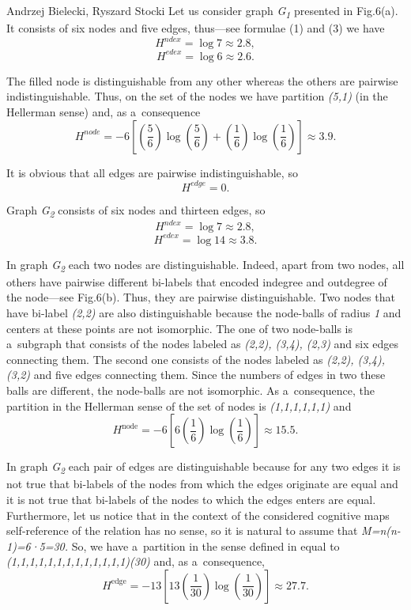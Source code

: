 \begin{artengenv2auth}{Andrzej Bielecki, Ryszard Stocki}
Let us consider graph \textit{G}\textit{\textsubscript{1}} presented in Fig.6(a). It consists of six nodes and five edges, thus---see formulae (1) and (3) we have
\[
H^{\textit{ndex}} = \log 7 \approx 2.8,
\]
\[
H^{\textit{edex}} = \log 6 \approx 2.6.
\]

The filled node is distinguishable from any other whereas the others are pairwise indistinguishable. Thus, on the set of the nodes we have partition \textit{(5,1)} (in the Hellerman sense) and, as a~consequence
\[
H^{\textit{node}} = -6 \left[ \left(\frac{5}{6}\right) \log\left(\frac{5}{6}\right) + \left(\frac{1}{6}\right) \log\left(\frac{1}{6}\right) \right] \approx 3.9.
\]

It is obvious that all edges are pairwise indistinguishable, so
\[
H^{\textit{edge}} = 0.
\]

Graph \textit{G}\textit{\textsubscript{2}} consists of six nodes and thirteen edges, so
\[
H^{\textit{ndex}} = \log 7 \approx 2.8,
\]
\[
H^{\textit{edex}} = \log 14 \approx 3.8.
\]

In graph \textit{G}\textit{\textsubscript{2}} each two nodes are distinguishable. Indeed, apart from two nodes, all others have pairwise different bi-labels that encoded indegree and outdegree of the node---see Fig.6(b). Thus, they are pairwise distinguishable. Two nodes that have bi-label \textit{(2,2)} are also distinguishable because the node-balls of radius \textit{1} and centers at these points are not isomorphic. The one of two node-balls is a~subgraph that consists of the nodes labeled as \textit{(2,2), (3,4), (2,3)} and six edges connecting them. The second one consists of the nodes labeled as \textit{(2,2), (3,4), (3,2)} and five edges connecting them. Since the numbers of edges in two these balls are different, the node-balls are not isomorphic. As a~consequence, the partition in the Hellerman sense of the set of nodes is \textit{(1,1,1,1,1,1)} and
\[
H^{\text{node}} = -6 \left[ 6 \left(\frac{1}{6}\right) \log\left(\frac{1}{6}\right) \right] \approx 15.5.
\]

In graph \textit{G}\textit{\textsubscript{2}} each pair of edges are distinguishable because for any two edges it is not true that bi-labels of the nodes from which the edges originate are equal and it is not true that bi-labels of the nodes to which the edges enters are equal. Furthermore, let us notice that in the context of the considered cognitive maps self-reference of the relation has no sense, so it is natural to assume that \textit{M=n(n-1)=6·5=30.} So, we have a~partition in the sense defined in 
\parencite[][]{bielecki_information_2022} %
 equal to \textit{(1,1,1,1,1,1,1,1,1,1,1,1,1)(30)} and, as a~consequence,
\[
H^{\text{edge}} = -13 \left[ 13 \left(\frac{1}{30}\right) \log\left(\frac{1}{30}\right) \right] \approx 27.7.
\]


\end{artengenv2auth}
